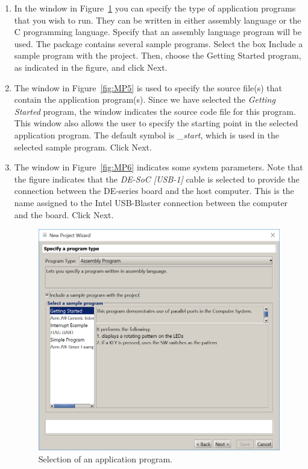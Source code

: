 \documentclass[epsfig,10pt,fullpage]{article}
\begin{document}
\begin{enumerate}
\item In the window in Figure~\ref{fig:MP4} you can specify the type of application 
programs that you wish to run. They can be written in either assembly language
or the C programming language.  Specify that an assembly language program will be used. 
The \productNameMed{} package contains several sample programs.
Select the box {\sf Include a sample program with the project}.
Then, choose the {\sf Getting Started} program, as indicated in the figure, and 
click {\sf Next}.

\item The window in Figure~\ref{fig:MP5} is used to specify the source file(s) that contain the
application program(s).
Since we have selected the {\it Getting Started} program, the window indicates the source
code file for this program. This window also allows the user to specify the starting point in the
selected application program. The default symbol is {\it \_start}, which is used
in the selected sample program. Click {\sf Next}. 

\item The window in Figure~\ref{fig:MP6} indicates some system parameters.
Note that the figure indicates that the {\it DE-SoC [USB-1]} cable is selected to provide 
the connection between the DE-series board and the host computer. This is the name assigned to the 
Intel USB-Blaster connection between the computer and the board.  Click {\sf Next}.

\begin{figure}[H]
	\begin{center}
	\includegraphics[scale=0.65]{figures/figureMP4.png}
	\end{center}
	\caption{Selection of an application program.}
\label{fig:MP4}
\end{figure}


\end{enumerate}
\end{document}
